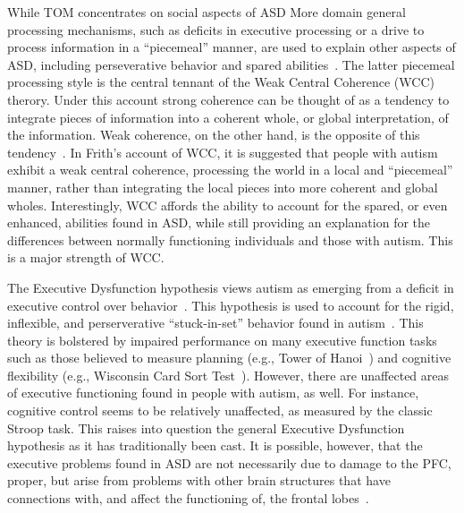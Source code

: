  While TOM concentrates on social aspects of ASD More domain general processing mechanisms, such as deficits in executive processing or a drive to process information in a ``piecemeal'' manner, are used to explain other aspects of ASD, including perseverative behavior and spared abilities~\cite{HillEL:2004:AutismExecutiveDysfunction}.  The latter piecemeal processing style is the central tennant of the Weak Central Coherence (WCC)~\cite{HappeF:1999:WCC,RefWorks:116} therory.  Under this account strong coherence can be thought of as a tendency to integrate pieces of information into a coherent whole, or global interpretation, of the information. Weak coherence, on the other hand, is the opposite of this tendency~\cite{WitkinHA:1971:EFT}.  In Frith's account of WCC, it is suggested that people with autism exhibit a weak central coherence, processing the world in a local and ``piecemeal'' manner, rather than integrating the local pieces into more coherent and global wholes.  Interestingly, WCC affords the ability to account for the spared, or even enhanced, abilities found in ASD, while still providing an explanation for the differences between normally functioning individuals and those with autism. This is a major strength of WCC.   

The Executive Dysfunction hypothesis views autism as emerging from a deficit in executive control over behavior~\cite{HughesC:1994:AutismExecutiveDysfunction,Ozonoff:1991:AutismExecutiveDysfunction}. This hypothesis is used to account for the rigid, inflexible, and perserverative ``stuck-in-set'' behavior found in autism~\cite{HillEL:2004:AutismExecutiveDysfunction}.  This theory is bolstered by impaired performance on many executive function tasks such as those believed to measure planning (e.g., Tower of Hanoi~\cite{HughesC:1994:AutismExecutiveDysfunction,Ozonoff:1999:AutismStroopWCST}) and cognitive flexibility (e.g., Wisconsin Card Sort Test~\cite{BennettoL:1996:AutismPlanningWCST}).  However, there are unaffected areas of executive functioning found in people with autism, as well.  For instance, cognitive control seems to be relatively unaffected, as measured by the classic Stroop task.  This raises into question the general Executive Dysfunction hypothesis as it has traditionally been cast.  It is possible, however, that the executive problems found in ASD are not necessarily due to damage to the PFC, proper, but arise from problems with other brain structures that have connections with, and affect the functioning of, the frontal lobes~\cite{RobbinsTW:1997:AutismNeurological}.  


